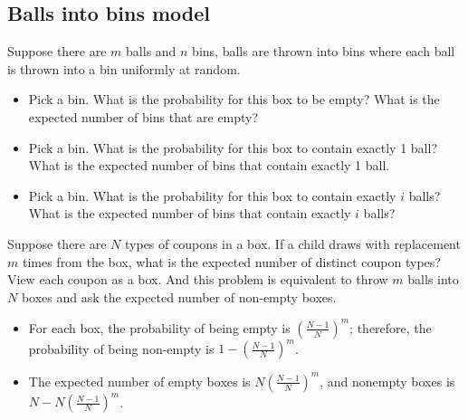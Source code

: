 \begin{refsection}
\subsection{Balls into bins model}



\begin{definition}
Suppose there are $m$ balls and $n$ bins, balls are thrown into bins where each ball is thrown into a bin uniformly at random. 
\begin{itemize}
	\item Pick a bin. What is the probability for this box to be empty? What is the expected number of bins that are empty?
	\item Pick a bin. What is the probability for this box to contain exactly 1 ball? What is the expected number of bins that contain exactly 1 ball.
	\item Pick a bin. What is the probability for this box to contain exactly $i$ balls? What is the expected number of bins that contain exactly $i$ balls?
\end{itemize}
\end{definition}

\begin{example}
	Suppose there are $N$ types of coupons in a box. If a child draws with replacement $m$ times from the box, what is the expected number of distinct coupon types?\\
	
	View each coupon as a box. And this problem is equivalent to throw $m$ balls into $N$ boxes and ask the expected number of non-empty boxes. 
	
	\begin{itemize}
		\item For each box, the probability of being empty is $(\frac{N-1}{N})^m$; therefore, the probability of being non-empty is $1- (\frac{N-1}{N})^m$.
		\item The expected number of empty boxes is $N(\frac{N-1}{N})^m$, and nonempty boxes is $N - N(\frac{N-1}{N})^m$.
	\end{itemize}
\end{example}



\end{refsection}
